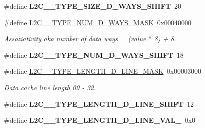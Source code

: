 \begin{DoxyCompactItemize}
\mbox{\label{group__L2C-310__cache_ga230e523ab48a194bfd0cb5e0ddd73adc}} 
\#define {\bfseries L2\+C\+\_\+\_\+\+T\+Y\+P\+E\+\_\+\+S\+I\+Z\+E\+\_\+\+D\+\_\+\+W\+A\+Y\+S\+\_\+\+S\+H\+I\+FT}~20
\item 
\mbox{\label{group__L2C-310__cache_ga608df5bbad32b3df7129de78bc0864c7}} 
\#define \mbox{\hyperlink{group__L2C-310__cache_ga608df5bbad32b3df7129de78bc0864c7}{L2\+C\+\_\+\_\+\+T\+Y\+P\+E\+\_\+\+N\+U\+M\+\_\+\+D\+\_\+\+W\+A\+Y\+S\+\_\+\+M\+A\+SK}}~0x00040000
\begin{DoxyCompactList}\small\item\em Assoziativity aka number of data ways = (value $\ast$ 8) + 8. \end{DoxyCompactList}\item 
\mbox{\label{group__L2C-310__cache_ga7c2fa676d24cf4f6f56f2319252398bb}} 
\#define {\bfseries L2\+C\+\_\+\_\+\+T\+Y\+P\+E\+\_\+\+N\+U\+M\+\_\+\+D\+\_\+\+W\+A\+Y\+S\+\_\+\+S\+H\+I\+FT}~18
\item 
\mbox{\label{group__L2C-310__cache_ga5f57cad172122d3211134e27dcdfe532}} 
\#define \mbox{\hyperlink{group__L2C-310__cache_ga5f57cad172122d3211134e27dcdfe532}{L2\+C\+\_\+\_\+\+T\+Y\+P\+E\+\_\+\+L\+E\+N\+G\+T\+H\+\_\+\+D\+\_\+\+L\+I\+N\+E\+\_\+\+M\+A\+SK}}~0x00003000
\begin{DoxyCompactList}\small\item\em Data cache line length 00 -\/ 32. \end{DoxyCompactList}\item 
\mbox{\label{group__L2C-310__cache_ga779546858cc8f04d0c3c7735f69ef75e}} 
\#define {\bfseries L2\+C\+\_\+\_\+\+T\+Y\+P\+E\+\_\+\+L\+E\+N\+G\+T\+H\+\_\+\+D\+\_\+\+L\+I\+N\+E\+\_\+\+S\+H\+I\+FT}~12
\item 
\mbox{\label{group__L2C-310__cache_gaa99a10b23f29d816c1014633c5ccf94a}} 
\#define {\bfseries L2\+C\+\_\+\_\+\+T\+Y\+P\+E\+\_\+\+L\+E\+N\+G\+T\+H\+\_\+\+D\+\_\+\+L\+I\+N\+E\+\_\+\+V\+A\+L\+\_}~0x0
\item 
\mbox{\label{group__L2C-310__cache_gaf07d47ae4165a97e148db412d8e34444}} 

\end{DoxyCompactItemize}
